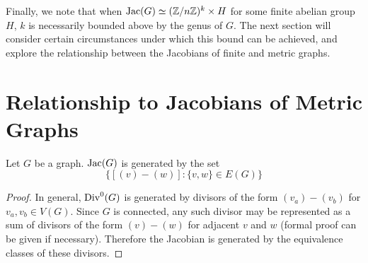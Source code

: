 \documentclass{amsart}
\begin{document}
Finally, we note that when $\operatorname{Jac}(G) \simeq (\mathbb{Z}/n\mathbb{Z})^k \times H$ for
some finite abelian group $H$, $k$ is necessarily bounded above by the
genus of $G$. The next section will consider certain circumstances
under which this bound can be achieved, and explore the relationship
between the Jacobians of finite and metric graphs.

\section{Relationship to Jacobians of Metric Graphs}
\begin{lem}
  \label{lem:jac_generators}
  Let $G$ be a graph. $\operatorname{Jac}(G)$ is generated by the set \[\{[(v) -
  (w)]: \{v, w\} \in E(G)\}\]
\end{lem}

\begin{proof}
  In general, $\operatorname{Div}^0(G)$ is generated by divisors of the form $(v_a)
  - (v_b)$ for $v_a, v_b \in V(G)$. Since $G$ is connected, any such
  divisor may be represented as a sum of divisors of the form $(v) -
  (w)$ for adjacent $v$ and $w$ (formal proof can be given if
  necessary). Therefore the Jacobian is generated by the equivalence
  classes of these divisors.  
\end{proof}
\end{document}
